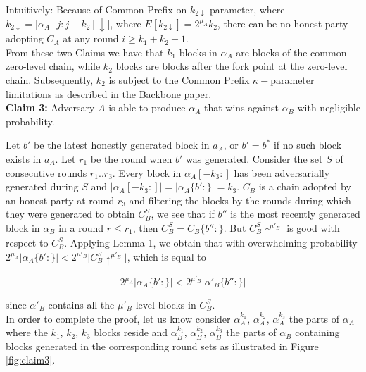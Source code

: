 \documentclass[9pt,a4paper]{article}
\begin{document}
Intuitively: Because of Common Prefix on $k_{2\downarrow}$ parameter, where $k_{2\downarrow} = \vert \alpha_A[j:j+k_2]\downarrow\vert$, where $E[k_{2\downarrow}] = 2^{\mu_A}k_2$, there can be no honest party adopting $C_A$ at any round $i \geq k_1 + k_2 + 1$. \\

From these two Claims we have that $k_1$ blocks in $\alpha_A$ are blocks of the common zero-level chain, while $k_2$ blocks are blocks after the fork point at the zero-level chain. Subsequently, $k_2$ is subject to the Common Prefix $\kappa-$parameter limitations as described in the Backbone paper\cite{Backbone}.\\

\textbf{Claim 3:} Adversary $A$ is able to produce $\alpha_A$ that wins against $\alpha_B$ with negligible probability.

Let $b'$ be the latest honestly generated block in $a_A$, or $b' = b^*$ if no such block exists in $a_A$. Let $r_1$ be the round when $b'$ was generated. Consider the set $S$ of consecutive rounds $r_1..r_3$. Every block in $\alpha_A[-k_3:]$ has been adversarially generated during $S$ and $\vert \alpha_A[-k_3:] \vert = \vert \alpha_A\{b':\} \vert = k_3$. $C_B$ is a chain adopted by an honest party at round $r_3$ and filtering the blocks by the rounds during which they were generated to obtain $C_B^S$, we see that if $b''$ is the most recently generated block in $\alpha_B$ in a round $r \leq r_1$, then $C_B^S = C_B\{ b'': \}$. But $C_B^S \uparrow^{\mu'_B}$ is good with respect to $C_B^S$. Applying Lemma 1, we obtain that with overwhelming probability  $2^{\mu_A} \vert \alpha_A\{b':\} \vert < 2^{\mu'_B} \vert C_B^S \uparrow^{\mu'_B} \vert$, which is equal to

\begin{equation}
2^{\mu_A} \vert \alpha_A\{b':\} \vert < 2^{\mu'_B} \vert \alpha'_B\{b'':\} \vert
\end{equation} 

since $\alpha'_B$ contains all the $\mu'_B$-level blocks in $C_B^S$. \\


In order to complete the proof, let us know consider $\alpha_A^{k_1}$, $\alpha_A^{k_2}$, $\alpha_A^{k_3}$ the parts of $\alpha_A$ where the $k_1$, $k_2$, $k_3$ blocks reside and 
$\alpha_B^{k_1}$, $\alpha_B^{k_2}$, $\alpha_B^{k_3}$ the parts of $\alpha_B$ containing blocks generated in the corresponding round sets as illustrated in Figure \ref{fig:claim3}.
\end{document}
